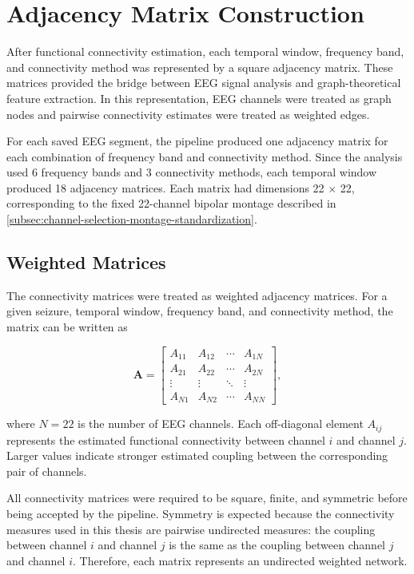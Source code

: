 \section{Adjacency Matrix Construction}
\label{sec:adjacency-matrix-construction}

After functional connectivity estimation, each temporal window, frequency band,
and connectivity method was represented by a square adjacency matrix. These
matrices provided the bridge between EEG signal analysis and graph-theoretical
feature extraction. In this representation, EEG channels were treated as graph
nodes and pairwise connectivity estimates were treated as weighted edges.

For each saved EEG segment, the pipeline produced one adjacency matrix for each
combination of frequency band and connectivity method. Since the analysis used
\num{6} frequency bands and \num{3} connectivity methods, each temporal window
produced \num{18} adjacency matrices. Each matrix had dimensions
\num{22} $\times$ \num{22}, corresponding to the fixed \num{22}-channel bipolar
montage described in \cref{subsec:channel-selection-montage-standardization}.

\subsection{Weighted Matrices}
\label{subsec:weighted-matrices}

The connectivity matrices were treated as weighted adjacency matrices. For a
given seizure, temporal window, frequency band, and connectivity method, the
matrix can be written as

\[
    \mathbf{A} =
    \begin{bmatrix}
    A_{11} & A_{12} & \cdots & A_{1N} \\
    A_{21} & A_{22} & \cdots & A_{2N} \\
    \vdots & \vdots & \ddots & \vdots \\
    A_{N1} & A_{N2} & \cdots & A_{NN}
    \end{bmatrix},
\]

where $N = 22$ is the number of EEG channels. Each off-diagonal element
$A_{ij}$ represents the estimated functional connectivity between channel $i$
and channel $j$. Larger values indicate stronger estimated coupling between the
corresponding pair of channels.

All connectivity matrices were required to be square, finite, and symmetric
before being accepted by the pipeline. Symmetry is expected because the
connectivity measures used in this thesis are pairwise undirected measures:
the coupling between channel $i$ and channel $j$ is the same as the coupling
between channel $j$ and channel $i$. Therefore, each matrix represents an
undirected weighted network.

